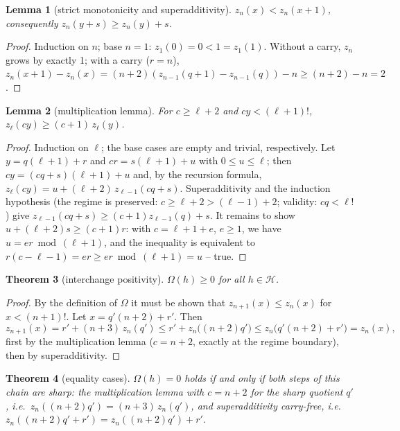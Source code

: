 \documentclass[11pt]{article}
\newtheorem{satz}{Theorem}[section]
\newtheorem{lemma}[satz]{Lemma}
\theoremstyle{definition}
\theoremstyle{remark}
\newcommand{\Hori}{\mathcal H}
\begin{document}
\begin{lemma}[strict monotonicity and superadditivity]
$z_n(x)<z_n(x{+}1)$, consequently $z_n(y{+}s)\ge z_n(y)+s$.
\end{lemma}

\begin{proof}
Induction on $n$; base $n=1$: $z_1(0)=0<1=z_1(1)$. Without a
carry, $z_n$ grows by exactly 1; with a
carry ($r=n$),
$z_n(x{+}1)-z_n(x)=(n{+}2)(z_{n-1}(q{+}1)-z_{n-1}(q))-n
\ge(n{+}2)-n=2$.
\end{proof}

\begin{lemma}[multiplication lemma]
For $c\ge\ell{+}2$ and $cy<(\ell{+}1)!$,
$z_\ell(cy)\ge(c{+}1)\,z_\ell(y)$.
\end{lemma}

\begin{proof}
Induction on $\ell$; the base cases are empty and trivial,
respectively. Let
$y=q(\ell{+}1)+r$ and $cr=s(\ell{+}1)+u$ with $0\le u\le\ell$;
then $cy=(cq{+}s)(\ell{+}1)+u$ and, by the recursion formula,
$z_\ell(cy)=u+(\ell{+}2)\,z_{\ell-1}(cq{+}s)$. Superadditivity
and the induction hypothesis (the regime is preserved:
$c\ge\ell{+}2>(\ell{-}1){+}2$; validity: $cq<\ell!$) give
$z_{\ell-1}(cq{+}s)\ge(c{+}1)z_{\ell-1}(q)+s$. It remains to show
$u+(\ell{+}2)s\ge(c{+}1)r$: with $c=\ell{+}1{+}e$, $e\ge1$, we
have $u=er\bmod(\ell{+}1)$, and the inequality is equivalent to
$r(c{-}\ell{-}1)=er\ge er\bmod(\ell{+}1)=u$ -- true.
\end{proof}

\begin{satz}[interchange positivity]
$\Omega(h)\ge0$ for all $h\in\Hori$.
\end{satz}

\begin{proof}
By the definition of $\Omega$ it must be shown that
$z_{n+1}(x)\le z_n(x)$ for $x<(n{+}1)!$. Let
$x=q'(n{+}2)+r'$. Then
\[
z_{n+1}(x)=r'+(n{+}3)\,z_n(q')
\le r'+z_n\bigl((n{+}2)q'\bigr)
\le z_n\bigl(q'(n{+}2)+r'\bigr)=z_n(x),
\]
first by the multiplication lemma ($c=n{+}2$, exactly at the
regime boundary), then by superadditivity.
\end{proof}

\begin{satz}[equality cases]
$\Omega(h)=0$ holds if and only if both steps of this chain are
sharp: the multiplication lemma with $c=n{+}2$ for the
\emph{sharp quotient} $q'$, i.e.\
$z_n((n{+}2)q')=(n{+}3)\,z_n(q')$, and superadditivity
carry-free, i.e.\ $z_n((n{+}2)q'+r')=z_n((n{+}2)q')+r'$.
\end{satz}
\end{document}
